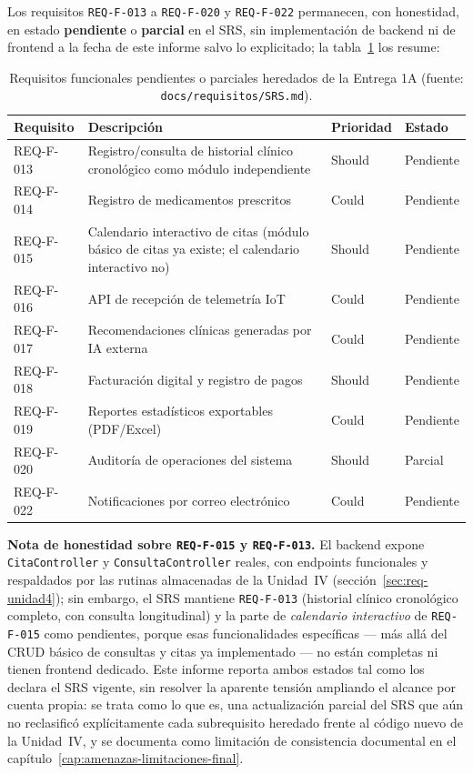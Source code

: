 Los requisitos \texttt{REQ-F-013} a \texttt{REQ-F-020} y \texttt{REQ-F-022}
permanecen, con honestidad, en estado \textbf{pendiente} o \textbf{parcial}
en el SRS, sin implementaci\'on de backend ni de frontend a la fecha de
este informe salvo lo explicitado; la tabla~\ref{tab:req-pendientes} los
resume:

\begin{table}[H]
  \centering
  \small
  \caption{Requisitos funcionales pendientes o parciales heredados de la Entrega 1A (fuente: \texttt{docs/requisitos/SRS.md}).}
  \label{tab:req-pendientes}
  \begin{tabular}{@{}p{2.0cm}p{6.4cm}p{1.6cm}p{2.0cm}@{}}
    \toprule
    Requisito & Descripci\'on & Prioridad & Estado \\
    \midrule
    REQ-F-013 & Registro/consulta de historial cl\'inico cronol\'ogico como m\'odulo independiente & Should & Pendiente \\
    REQ-F-014 & Registro de medicamentos prescritos & Could & Pendiente \\
    REQ-F-015 & Calendario interactivo de citas (m\'odulo b\'asico de citas ya existe; el calendario interactivo no) & Should & Pendiente \\
    REQ-F-016 & API de recepci\'on de telemetr\'ia IoT & Could & Pendiente \\
    REQ-F-017 & Recomendaciones cl\'inicas generadas por IA externa & Could & Pendiente \\
    REQ-F-018 & Facturaci\'on digital y registro de pagos & Should & Pendiente \\
    REQ-F-019 & Reportes estad\'isticos exportables (PDF/Excel) & Could & Pendiente \\
    REQ-F-020 & Auditor\'ia de operaciones del sistema & Should & Parcial \\
    REQ-F-022 & Notificaciones por correo electr\'onico & Could & Pendiente \\
    \bottomrule
  \end{tabular}
\end{table}

\textbf{Nota de honestidad sobre \texttt{REQ-F-015} y \texttt{REQ-F-013}.}
El backend expone \texttt{CitaController} y \texttt{ConsultaController}
reales, con endpoints funcionales y respaldados por las rutinas
almacenadas de la Unidad~IV (secci\'on~\ref{sec:req-unidad4}); sin embargo,
el SRS mantiene \texttt{REQ-F-013} (historial cl\'inico cronol\'ogico
completo, con consulta longitudinal) y la parte de \emph{calendario
interactivo} de \texttt{REQ-F-015} como pendientes, porque esas
funcionalidades espec\'ificas --- m\'as all\'a del CRUD b\'asico de
consultas y citas ya implementado --- no est\'an completas ni tienen
frontend dedicado. Este informe reporta ambos estados tal como los declara
el SRS vigente, sin resolver la aparente tensi\'on ampliando el alcance
por cuenta propia: se trata como lo que es, una actualizaci\'on parcial del
SRS que a\'un no reclasific\'o expl\'icitamente cada subrequisito heredado
frente al c\'odigo nuevo de la Unidad~IV, y se documenta como limitaci\'on
de consistencia documental en el cap\'itulo~\ref{cap:amenazas-limitaciones-final}.

